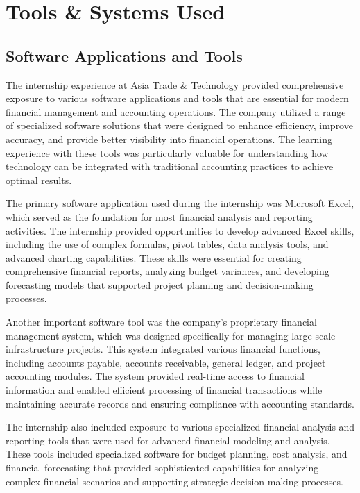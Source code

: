 \section{Tools \& Systems Used}

\subsection{Software Applications and Tools}
The internship experience at Asia Trade \& Technology provided comprehensive exposure to various software applications and tools that are essential for modern financial management and accounting operations. The company utilized a range of specialized software solutions that were designed to enhance efficiency, improve accuracy, and provide better visibility into financial operations. The learning experience with these tools was particularly valuable for understanding how technology can be integrated with traditional accounting practices to achieve optimal results.

The primary software application used during the internship was Microsoft Excel, which served as the foundation for most financial analysis and reporting activities. The internship provided opportunities to develop advanced Excel skills, including the use of complex formulas, pivot tables, data analysis tools, and advanced charting capabilities. These skills were essential for creating comprehensive financial reports, analyzing budget variances, and developing forecasting models that supported project planning and decision-making processes.

Another important software tool was the company's proprietary financial management system, which was designed specifically for managing large-scale infrastructure projects. This system integrated various financial functions, including accounts payable, accounts receivable, general ledger, and project accounting modules. The system provided real-time access to financial information and enabled efficient processing of financial transactions while maintaining accurate records and ensuring compliance with accounting standards.

The internship also included exposure to various specialized financial analysis and reporting tools that were used for advanced financial modeling and analysis. These tools included specialized software for budget planning, cost analysis, and financial forecasting that provided sophisticated capabilities for analyzing complex financial scenarios and supporting strategic decision-making processes.

